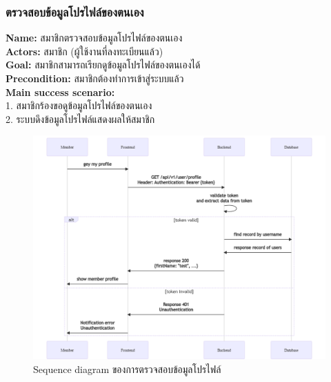 \documentclass[12pt,oneside,openright,a4paper]{cpe-thai-project}
\begin{document}
\subsubsection{ตรวจสอบข้อมูลโปรไฟล์ของตนเอง}
\textbf{Name: }สมาชิกตรวจสอบข้อมูลโปรไฟล์ของตนเอง \\
\textbf{Actors: }สมาชิก (ผู้ใช้งานที่ลงทะเบียนแล้ว) \\
\textbf{Goal: }สมาชิกสามารถเรียกดูข้อมูลโปรไฟล์ของตนเองได้ \\
\textbf{Precondition: }สมาชิกต้องทำการเข้าสู่ระบบแล้ว \\
\textbf{Main success scenario: } \\
  \hspace*{0.5cm}1. สมาชิกร้องขอดูข้อมูลโปรไฟล์ของตนเอง  \\
  \hspace*{0.5cm}2. ระบบดึงข้อมูลโปรไฟล์แสดงผลให้สมาชิก \\ \newpage 
\begin{figure}[!ht]\centering
  \includegraphics[width=\textwidth]{./img/seq_profile.png}
  \caption{Sequence diagram ของการตรวจสอบข้อมูลโปรไฟล์}\label{fig:seq_profile} 
\end{figure} 
\end{document}
